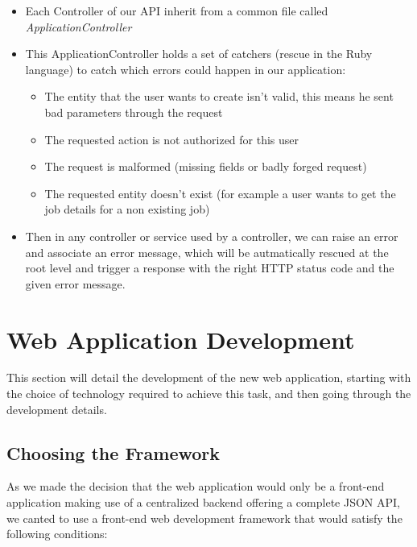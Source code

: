 \documentclass{eplmastersthesis}
\begin{document}
          \begin{itemize}
            \item Each Controller of our API inherit from a common file
            called \textit{ApplicationController}
            \item This ApplicationController holds a set of catchers (rescue
            in the Ruby language) to catch which errors could happen in our
            application:
              \begin{itemize}
                \item The entity that the user wants to create isn't valid, this
                means he sent bad parameters through the request
                \item The requested action is not authorized for this user
                \item The request is malformed (missing fields or badly forged
                request)
                \item The requested entity doesn't exist (for example a user
                wants to get the job details for a non existing job)
              \end{itemize}
            \item Then in any controller or service used by a controller, we
            can raise an error and associate an error message, which will be
            autmatically rescued at the root level and trigger a response with
            the right HTTP status code and the given error message.
          \end{itemize}

    \section{Web Application Development}

      This section will detail the development of the new web application,
      starting with the choice of technology required to achieve this task, and
      then going through the development details.

      \subsection{Choosing the Framework}

        As we made the decision that the web application would only be a
        front-end application making use of a centralized backend offering
        a complete JSON API, we canted to use a front-end web development
        framework that would satisfy the following conditions: \\
\end{document}
